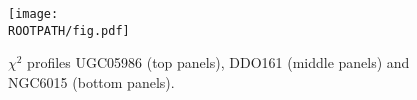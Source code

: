 \begin{figure}%
	\centering%
	\texttt{[image: \\ROOTPATH/fig.pdf]}%
	\caption{$\chi^2$ profiles  UGC05986 (top panels), DDO161 (middle panels) and NGC6015 (bottom panels).}%
	\label{fig:chi-analysis}%
\end{figure}